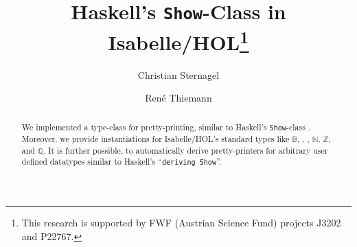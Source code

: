 \documentclass[11pt,a4paper]{article}
\newcommand\nats{\mathbb{N}}
\newcommand\bools{\mathbb{B}}
\newcommand\ints{\mathbb{Z}}
\newcommand\rats{\mathbb{Q}}
\newcommand\Show{\texttt{Show}}
\begin{document}
\title{Haskell's \Show-Class in Isabelle/HOL\thanks{This research is supported by FWF (Austrian Science Fund) projects J3202 and P22767.}}
\author{Christian Sternagel \and Ren\'e Thiemann}
\maketitle

\begin{abstract}
  We implemented a type-class for pretty-printing, similar to Haskell's
  \Show-class \cite{HaskellTutorial}. Moreover, we provide instantiations for Isabelle/HOL's 
  standard types like $\bools$, , , $\nats$, $\ints$, and $\rats$.
  It is further possible, to automatically derive pretty-printers for
  arbitrary user defined datatypes similar to Haskell's ``\texttt{deriving Show}''.
\end{abstract}



\tableofcontents





\end{document}
